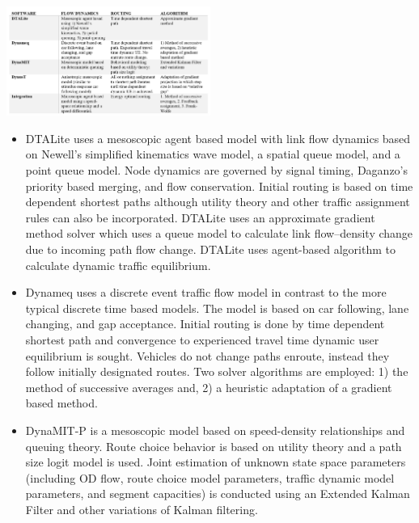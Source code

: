 \begin{table}
    \centering
    \includegraphics[width=0.5\textwidth]{figs/lit_table.PNG}
    \caption{}
    \label{tab:times}
\end{table}

\begin{itemize}
\item DTALite \cite{zhou2014dtalite} uses a mesoscopic agent based model with link flow dynamics based on Newell’s simplified kinematics wave model, a spatial queue model, and a point queue model. Node dynamics are governed by signal timing, Daganzo’s priority based merging, and flow conservation. Initial routing is based on time dependent shortest paths although utility theory and other traffic assignment rules can also be incorporated. DTALite uses an approximate gradient method solver which uses a queue model to calculate link flow–density change due to incoming path flow change. DTALite uses agent-based algorithm to calculate dynamic traffic equilibrium.
\item Dynameq uses a discrete event traffic flow model in contrast to the more typical discrete time based models. The model is based on car following, lane changing, and gap acceptance. Initial routing is done by time dependent shortest path and convergence to experienced travel time dynamic user equilibrium is sought. Vehicles do not change paths enroute, instead they follow initially designated routes. Two solver algorithms are employed: 1) the method of successive averages and, 2) a heuristic adaptation of a gradient based method.   
\item DynaMIT-P \cite{DynaMIT,ben2001dynamit} is a mesoscopic model based on speed-density relationships and queuing theory. Route choice behavior is based on utility theory and a path size logit model is used. Joint estimation of unknown state space parameters (including OD flow, route choice model parameters, traffic dynamic model parameters, and segment capacities) is conducted using an Extended Kalman Filter and other variations of Kalman filtering.   

\end{itemize}
